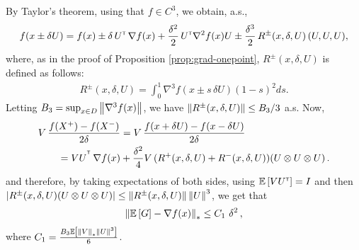 By Taylor's theorem, using that $f\in C^3$, we obtain, a.s.,
\begin{align*}
f(x \pm \delta U) =
 f(x)
 \pm\delta\,  U^\mathsf{\scriptscriptstyle T}\,\nabla f(x)
  + \frac{\delta^2}{2}\, U^\mathsf{\scriptscriptstyle T} \nabla^2 f(x) U
  \pm  \frac{\delta^3}{2} \, R^{\pm}(x,\delta,U) \,(U, U, U),
\end{align*}
where, as in the proof of Proposition \ref{prop:grad-onepoint}, $R^{\pm}(x,\delta,U)$ is defined as follows:
\begin{align}
 R^{\pm}(x,\delta,U)= \int_0^1  \nabla^3 f(  x \pm s \, \delta U ) (1-s)^2 ds. \label{eq:taylor-r-1p}
\end{align}
Letting $B_3 = \sup_{x\in D} \left\| \nabla^3 f(x) \right\|$,%
we have $\left\| R^{\pm}(x,\delta,U)\right\| \le B_3/3$ a.s.
Now,
\begin{align}
\begin{split}
\MoveEqLeft       V\, \dfrac{f(X^+)-f(X^-)}{2\delta}
  = V\, \dfrac{f(x+\delta U) - f(x-\delta U)}{2\delta} \\
&= VU^{\tr}
\, \nabla f(x)   +   \frac{\delta^2}{4}  V \,(R^{+}(x,\delta,U)+R^{-}(x,\delta,U))(U \otimes U \otimes U)\,.
\end{split}
\label{eq:l1}
\end{align}
and therefore,
by taking expectations of both sides,
using $\mathbb{E}\left[V U^\mathsf{\scriptscriptstyle T}\right] = I$ and then $|R^{\pm}(x,\delta,U) (U \otimes U \otimes U)| \le
\left\|R^{\pm}(x,\delta,U)\right\| \left\|U\right\|^3$,
we get that
\begin{align*}
\left\| \mathbb{E}\left[ G \right] - \nabla f(x) \right\|_*
\le C_1\,\, \delta^2 \,,
\end{align*}
where $C_1 = \frac{B_3 \mathbb{E}\left[ \left\|V\right\|_* \left\|U\right\|^3 \right]}{6}$.

